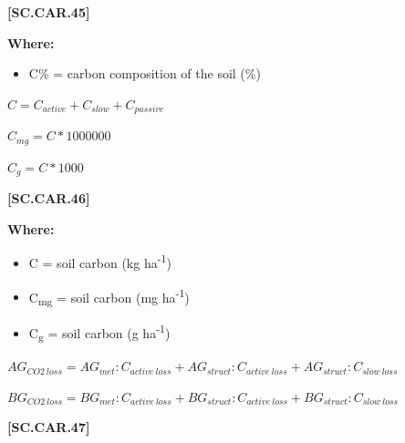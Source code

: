             {\raggedleft \textbf{[SC.CAR.45]}\par}
            \vspace{0.5cm}

        \textbf{Where:}
            
        \begin{itemize}
            \item C\% = carbon composition of the soil (\%)
        \end{itemize}
        \vspace{0.5cm}

    \begin{center}
\(C=C_{active}+C_{slow}+C_{passive}\)
\vspace{0.1cm}

\(C_{mg}=C * 1000000\)
\vspace{0.1cm}

\(C_{g}=C * 1000\)

    \end{center}
        \vspace{0.5cm} 
    
            {\raggedleft \textbf{[SC.CAR.46]}\par}
            \vspace{0.5cm}

        \textbf{Where:}
            
        \begin{itemize}
            \item C = soil carbon (kg ha\textsuperscript{-1})
            \item C\textsubscript{mg} = soil carbon (mg ha\textsuperscript{-1})
            \item C\textsubscript{g} = soil carbon (g ha\textsuperscript{-1})
        \end{itemize}
        \vspace{0.5cm}

    \begin{center}
\(AG_{CO2\ loss}=AG_{met}:C_{active\ loss}+AG_{struct}:C_{active\ loss}+AG_{struct}:C_{slow\ loss}\)
\vspace{0.1cm}

\(BG_{CO2\ loss}=BG_{met}:C_{active\ loss}+BG_{struct}:C_{active\ loss}+BG_{struct}:C_{slow\ loss}\)

    \end{center}
        \vspace{0.5cm} 
    
            {\raggedleft \textbf{[SC.CAR.47]}\par}
            \vspace{0.5cm}


